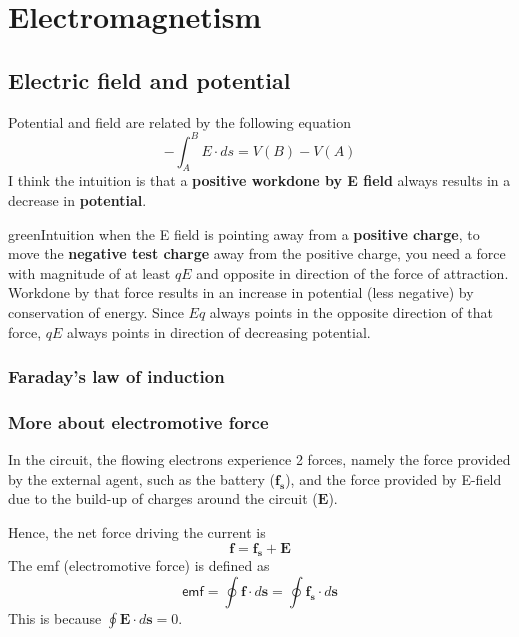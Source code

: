 \documentclass[12pt,a4paper]{extreport}
\numberwithin{equation}{chapter}
\renewcommand{\vec}[1]{\mathbf{#1}}
\begin{document}
    
    
\chapter{Electromagnetism}
    \section{Electric field and potential}
    Potential and field are related by the following equation
        \begin{equation}
            -\int_A^B E \cdot ds = V(B)-V(A) 
        \end{equation}
    I think the intuition is that a \textbf{positive workdone by E field} always results in a decrease in \textbf{potential}. 
  
    \begin{mybox}{green}{Intuition}
            when the E field is pointing away from a \textbf{positive charge}, to move the \textbf{negative test charge} away from the positive charge, you need a force with magnitude of at least $qE$ and opposite in direction of the force of attraction. Workdone by that force results in an increase in potential (less negative) by conservation of energy. Since $Eq$ always points in the opposite direction of that force, $qE$ always points in direction of decreasing potential. 
    \end{mybox} 
    \subsection{Faraday's law of induction}
    \subsection{More about electromotive force}
    
    In the circuit, the flowing electrons experience 2 forces, namely the force provided by the external agent, such as the battery ($\vec{f_s}$), and the force provided by E-field due to the build-up of charges around the circuit ($\vec{E}$).

    Hence, the net force driving the current is 
    \begin{equation}
        \vec{f}=\vec{f_s}+\vec{E}
    \end{equation}
    The emf (electromotive force) is defined as 
    \begin{equation}
        \textsf{emf}=\oint \mathbf{f} \cdot d\mathbf{s}=\oint \mathbf{f_s} \cdot d\mathbf{s}
    \end{equation}  
    This is because $\oint \mathbf{E} \cdot d\mathbf{s}=0$.
\end{document}
